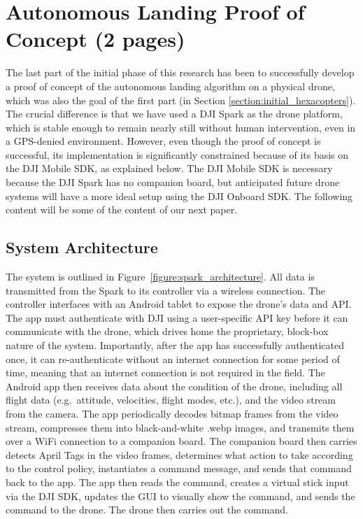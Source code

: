 \section{Autonomous Landing Proof of Concept (2 pages)}
\label{section:proof_of_concept}

The last part of the initial phase of this research has been to successfully develop a proof of concept
of the autonomous landing algorithm on a physical drone, which was also the goal of the first part (in Section \ref{section:initial_hexacopters}).
The crucial difference is that we have used a DJI Spark as the drone platform,
which is stable enough to remain nearly still without human intervention,
even in a GPS-denied environment.
However, even though the proof of concept is successful,
its implementation is significantly constrained because of its basis on the DJI Mobile SDK,
as explained below.
The DJI Mobile SDK is necessary because the DJI Spark has no companion board,
but anticipated future drone systems will have a more ideal setup using the DJI Onboard SDK.
The following content will be some of the content of our next paper.

\subsection{System Architecture}

The system is outlined in Figure~\ref{figure:spark_architecture}.
All data is transmitted from the Spark to its controller via a wireless connection.
The controller interfaces with an Android tablet to expose the drone's data and API.
The app must authenticate with DJI using a user-specific API key
before it can communicate with the drone,
which drives home the proprietary, block-box nature of the system.
Importantly, after the app has successfully authenticated once, it can re-authenticate without
an internet connection for some period of time,
meaning that an internet connection is not required in the field.
The Android app then receives data about the condition of the drone,
including all flight data (e.g.~attitude, velocities, flight modes, etc.),
and the video stream from the camera.
The app periodically decodes bitmap frames from the video stream,
compresses them into black-and-white .webp images,
and transmits them over a WiFi connection to a companion board.
The companion board then carries detects April Tags in the video frames,
determines what action to take according to the control policy,
instantiates a command message,
and sends that command back to the app.
The app then reads the command,
creates a virtual stick input via the DJI SDK,
updates the GUI to visually show the command,
and sends the command to the drone.
The drone then carries out the command.

